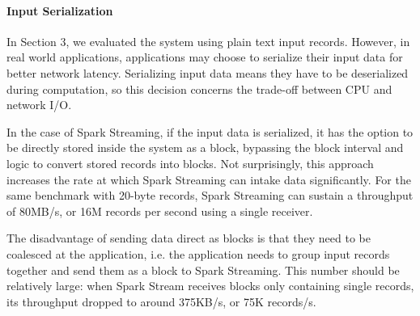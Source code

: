 \paragraph{Input Serialization}
In Section 3, we evaluated the system using plain text input records. However, in real world applications, applications may choose to serialize their input data for better network latency. Serializing input data means they have to be deserialized during computation, so this decision concerns the trade-off between CPU and network I/O.

In the case of Spark Streaming, if the input data is serialized, it has the option to be directly stored inside the system as a block, bypassing the block interval and logic to convert stored records into blocks. Not surprisingly, this approach increases the rate at which Spark Streaming can intake data significantly. For the same benchmark with 20-byte records, Spark Streaming can sustain a throughput of 80MB/s, or 16M records per second using a single receiver.

The disadvantage of sending data direct as blocks is that they need to be coalesced at the application, i.e. the application needs to group input records together and send them as a block to Spark Streaming. This number should be relatively large: when Spark Stream receives blocks only containing single records, its throughput dropped to around 375KB/s, or 75K records/s.




